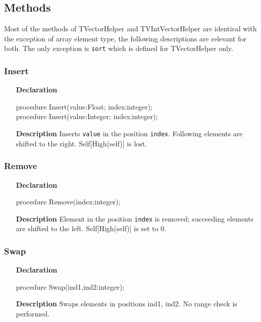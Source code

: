 \documentclass[12pt,a4paper,oneside]{report}
\newcommand{\declarationitem}[1]{\textbf{#1}}
\newcommand{\descriptiontitle}[1]{\textbf{#1}}
\newcommand{\code}[1]{\texttt{#1}}
\begin{document}
\subsection{Methods}
Most of the methods of TVectorHelper and TVIntVectorHelper are identical with the exception of array element type, the following descriptions are relevant for both. The only exception is \code{sort} which is defined for TVectorHelper only.
\subsubsection{Insert}
\begin{itemize}
	\item[\declarationitem{Declaration}\hfill]
	\begin{flushleft}
     procedure Insert(value:Float; index:integer);\\ \vspace{4pt}
     procedure Insert(value:Integer; index:integer);
	\end{flushleft}
	\item[\descriptiontitle{Description}]
	Inserts \code{value} in the position \code{index}. Following elements are shifted to the right. Self[High(self)] is lost.
\end{itemize}
\subsubsection{Remove}
\begin{itemize}
	\item[\declarationitem{Declaration}\hfill]
	\begin{flushleft}
     procedure Remove(index:integer);
	\end{flushleft}
	\item[\descriptiontitle{Description}\hfill]
	Element in the position \code{index} is removed; succeeding elements are shifted to the left. Self[High(self)] is set to 0. 
\end{itemize}
\subsubsection{Swap}
\begin{itemize}
	\item[\declarationitem{Declaration}\hfill]
	\begin{flushleft}
     procedure Swap(ind1,ind2:integer);
	\end{flushleft}
	\item[\descriptiontitle{Description}\hfill]
	Swaps elements in positions ind1, ind2. No range check is performed.
\end{itemize}
\end{document}
